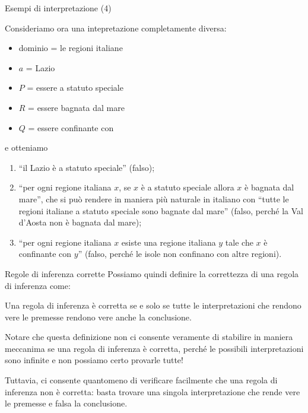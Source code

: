 \documentclass[aspectratio=169,10pt,dvipsnames,xcolor=table,handout]{beamer}
\begin{document}
\begin{frame}{Esempi di interpretazione (4)}
    \begin{example}
        Consideriamo ora una intepretazione completamente diversa:
        \begin{itemize}
            \item dominio = le regioni italiane
            \item $a$ = Lazio
            \item $P$ = essere a statuto speciale
            \item $R$ = essere bagnata dal mare
            \item $Q$ = essere confinante con
        \end{itemize}
        e otteniamo
        \begin{enumerate}
            \item ``il Lazio è a statuto speciale'' (falso);
            \item ``per ogni regione italiana $x$, se $x$ è a statuto speciale allora $x$ è bagnata dal mare'', che si può rendere in maniera più naturale in italiano con ``tutte le regioni italiane a statuto speciale sono bagnate dal mare'' (falso, perché la Val d'Aosta non è bagnata dal mare);
            \item ``per ogni regione italiana $x$ esiste una regione italiana $y$ tale che $x$ è confinante con $y$'' (falso, perché le isole non confinano con altre regioni).
        \end{enumerate}
    \end{example}
\end{frame}

\begin{frame}{Regole di inferenza corrette}
    Possiamo quindi definire la correttezza di una regola di inferenza come:
    \begin{definition}
        Una regola di inferenza è corretta se e solo se  tutte le interpretazioni che rendono vere le premesse rendono vere anche la conclusione.
    \end{definition}

    \medskip
    Notare che questa definizione non ci consente veramente di stabilire in maniera meccanima se una regola di inferenza è corretta, perché le possibili interpretazioni sono infinite e non possiamo certo provarle tutte!

    \medskip
    Tuttavia, ci consente quantomeno di verificare facilmente che una regola di inferenza non è corretta: basta trovare una singola interpretazione che rende vere le premesse e falsa la conclusione.
\end{frame}
\end{document}
